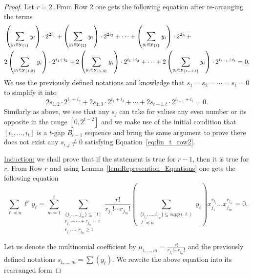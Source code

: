\begin{proof}
Let $r = 2$. From Row 2 one gets the following equation after re-arranging the
terms
\begin{equation*}
    \begin{split}
        &\left(\sum_{y_i \in \mathbf{y}_{\{1\}}} y_i\right) \cdot 2^{2 i_1} + \left(\sum_{y_i \in \mathbf{y}_{\{2\}}} y_i\right) \cdot 2^{ 2 i_2} + \cdots + \left(\sum_{y_i \in \mathbf{y}_{\{t\}}} y_i\right) \cdot 2^{ 2 i_t} +\\
        &2\left(\sum_{y_i \in \mathbf{y}_{\{1,2\}}} y_i\right) \cdot 2^{i_1 + i_2} + 2\left(\sum_{y_i \in \mathbf{y}_{\{1,3\}}} y_i\right) \cdot 2^{i_1 + i_3} + \cdots + 2\left(\sum_{y_i \in \mathbf{y}_{\{t-1, t\}}} y_i\right) \cdot 2^{i_{t-1} + i_{t}} = 0.
    \end{split}
\end{equation*}
We use the previously defined notations and knowledge that
$s_1 = s_2 = \cdots = s_t = 0$ to simplify it into
\begin{equation}\label{eq:lin_t_row2}
    2s_{1,2} \cdot 2^{i_1 + i_2} + 2s_{1,3} \cdot 2^{i_1 + i_3} + \cdots + 2s_{t-1,t} \cdot 2^{i_{t-1} + i_{t}} = 0.
\end{equation}
Similarly as above, we see that any $s_j$ can take for values any even number or
its opposite in the range $[0, 2^{t-2}]$ and we make use of the initial
condition that $[i_1, \ldots, i_t]$ is a $t$-gap $B_{t-1}$ sequence and bring
the same argument to prove there does not exist any $s_{i,j} \neq 0$ satisfying
Equation~\ref{eq:lin_t_row2}.

\underline{Induction:} we shall prove that if the statement is true for $r-1$,
then it is true for $r$. From Row $r$ and using Lemma~\ref{lem:Represention_Equations} one gets the following equation
\begin{equation*}
    \sum_{\ell \preceq n} \ell^r y_\ell = \sum_{m=1}^t\sum\limits_{\substack{\{j_1,\dots, j_m\}\subseteq[t]\\ r_{j_1}+\cdots+ r_{j_m}=r\\ r_{j_1}, \dots, r_{j_m} \geq 1}} \frac{r!}{r_{j_1}!\cdots r_{j_m}!} \left(\sum_{\substack{\{i_{j_1},\dots, i_{j_m}\} \subseteq supp(\ell)\\ \ell\preceq n}} y_{\ell} \right) x_{j_1}^{r_{j_1}}\dots x_{j_m}^{r_{j_m}} = 0.
\end{equation*}

Let us denote the multinomial coefficient by $\mu_{1,\ldots, m} = \frac{r!}{r_{j_1}!\cdots r_{j_m}!}$
and the previously defined notations $s_{1,\ldots, m} = \sum (y_\ell)$. We rewrite
the above equation into its rearranged form


\end{proof}
